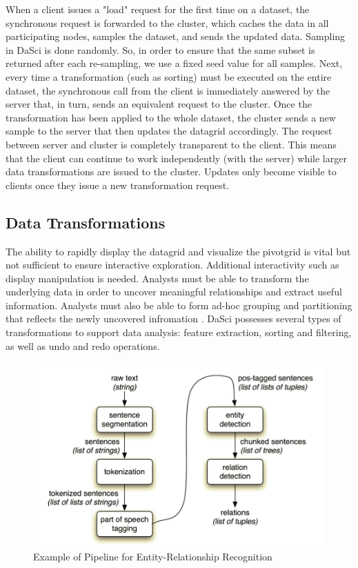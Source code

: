 \documentclass[10pt, a4paper, twocolumn]{article} %
\begin{document}
When a client issues a "load" request for the first time on a dataset, the synchronous request is forwarded to the cluster, which caches the data in all participating nodes, samples the dataset, and sends the updated data.
Sampling in DaSci is done randomly. So, in order to ensure that the same subset is returned after each re-sampling, we use a fixed seed value for all samples.
Next, every time a transformation (such as sorting) must be executed on the entire dataset, the synchronous call from the client is immediately answered by the server that, in turn, sends an equivalent request to the cluster. Once the transformation has been applied to the whole dataset, the cluster sends a new sample to the server that then updates the datagrid accordingly.
The request between server and cluster is completely transparent to the client. This means that the client can continue to work independently (with the server) while larger data transformations are issued to the cluster. Updates only become visible to clients once they issue a new transformation request.


\subsection{Data Transformations}

The ability to rapidly display the datagrid and visualize the pivotgrid is vital but not sufficient to ensure interactive exploration.
Additional interactivity such as display manipulation is needed. Analysts must be able to transform the underlying data in order to uncover meaningful relationships and extract useful information. Analysts must also be able to form ad-hoc grouping and partitioning that reflects the newly uncovered infromation \cite{polaris}.
DaSci possesses several types of transformations to support data analysis: feature extraction, sorting and filtering, as well as undo and redo operations.
  

\begin{figure}
	\centering
	\includegraphics[scale=0.5]{images/information-extraction.png}
	\caption{Example of Pipeline for Entity-Relationship Recognition \cite{nltk-book}}
	\label{figure:information-extraction}
\end{figure}
  
\end{document}
